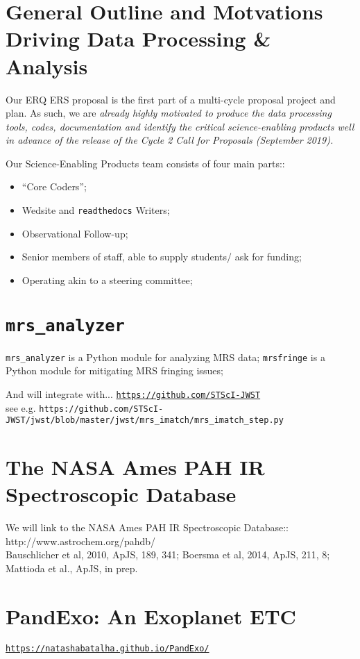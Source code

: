 \section{General Outline and Motvations Driving Data Processing \& Analysis}
Our ERQ ERS proposal is the first part of a multi-cycle proposal
project and plan.  As such, we are {\it already highly motivated to
produce the data processing tools, codes, documentation and identify
the critical science-enabling products well in advance of the release
of the Cycle 2 Call for Proposals (September 2019).}

\smallskip \smallskip
\noindent
Our Science-Enabling Products team consists of four main parts::
\begin{itemize}
    \item ``Core Coders''; 
    \item  Wedsite and {\tt readthedocs} Writers; 
    \item Observational Follow-up; 
    \item Senior members of staff, able to supply students/ ask for funding; 
    \item Operating akin to a steering committee; 
\end{itemize}


\section{{\tt mrs\_analyzer}} 
{\tt mrs\_analyzer} is  a Python module for analyzing MRS data; 
{\tt mrsfringe} is a Python module for mitigating MRS fringing issues; 

\smallskip \smallskip
\noindent
And will integrate with...
\href{https://github.com/STScI-JWST}{\tt https://github.com/STScI-JWST} \\
see e.g. 
{\tt https://github.com/STScI-JWST/jwst/blob/master/jwst/mrs\_imatch/mrs\_imatch\_step.py}


\section{The NASA Ames PAH IR Spectroscopic Database}
We will link to the NASA Ames PAH IR Spectroscopic Database:: \\
http://www.astrochem.org/pahdb/ \\
Bauschlicher et al, 2010, ApJS, 189, 341; Boersma et al, 2014, ApJS, 211, 8;  Mattioda et al., ApJS, in prep.\\


\section{PandExo: An Exoplanet ETC}
\href{https://natashabatalha.github.io/PandExo/}{\tt https://natashabatalha.github.io/PandExo/}


